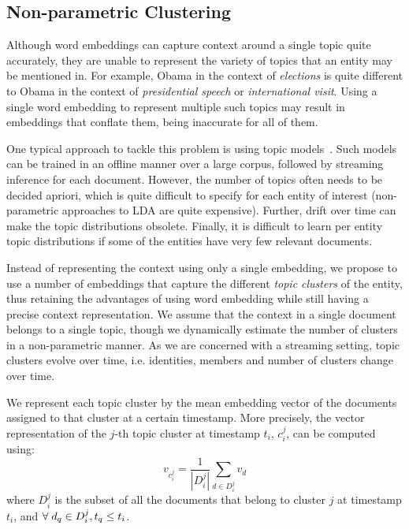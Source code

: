\documentclass{sig-alternate}
\begin{document}
\subsection{Non-parametric Clustering}
\label{non}

Although word embeddings can capture context around a single topic quite accurately, they are unable to represent the variety of topics that an entity may be mentioned in.
For example, Obama in the context of \emph{elections} is quite different to Obama in the context of \emph{presidential speech} or \emph{international visit}.
Using a single word embedding to represent multiple such topics may result in embeddings that conflate them, being inaccurate for all of them.

One typical approach to tackle this problem is using topic models~\cite{blei12}.
Such models can be trained in an offline manner over a large corpus, followed by streaming inference for each document.
However, the number of topics often needs to be decided apriori, which is quite difficult to specify for each entity of interest (non-parametric approaches to LDA are quite expensive).
Further, drift over time can make the topic distributions obsolete.
Finally, it is difficult to learn per entity topic distributions if some of the entities have very few relevant documents.


Instead of representing the context using only a single embedding, we propose to use a number of embeddings that capture the different \emph{topic clusters} of the entity, thus retaining the advantages of using word embedding while still having a precise context representation.
We assume that the context in a single document belongs to a single topic, though we dynamically estimate the number of clusters in a non-parametric manner.
As we are concerned with a streaming setting, topic clusters evolve over time, i.e. identities, members and number of clusters change over time. 

We represent each topic cluster by the mean embedding vector of the documents assigned to that cluster at a certain timestamp.
More precisely, the vector representation of the $j$-th topic cluster at timestamp $t_i$, $c^j_i$, can be computed using: %
\begin{equation}
\label{nonparamclust}
v_{c^j_i} = \frac{1}{|D^j_i|} \sum_{d \in D^j_i}{v_d}
\end{equation}
where $D^j_i$ is the subset of all the documents that belong to cluster $j$ at timestamp $t_i$, and $\forall\hspace{1mm}d_q \in D^j_i, t_q \leq t_i$.
\end{document}
